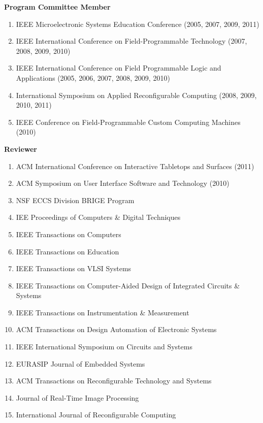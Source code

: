 \documentclass[line]{res}
\begin{document}
\begin{resume}
	\textbf{Program Committee Member}
	\begin{enumerate}
		\item IEEE Microelectronic Systems Education Conference (2005, 2007, 2009, 2011) 
		\item IEEE International Conference on Field-Programmable Technology (2007, 2008, 2009, 2010) 
		\item IEEE International Conference on Field Programmable Logic and Applications (2005, 2006, 2007, 2008, 2009, 2010) 
		\item International Symposium on Applied Reconfigurable Computing (2008, 2009, 2010, 2011) 
		\item IEEE Conference on Field-Programmable Custom Computing Machines (2010) 
	\end{enumerate}
	
	\textbf{Reviewer}
	\begin{enumerate}
		\item ACM International Conference on Interactive Tabletops and Surfaces (2011)
		\item ACM Symposium on User Interface Software and Technology (2010) 
		\item NSF ECCS Division BRIGE Program 
		\item IEE Proceedings of Computers \& Digital Techniques 
		\item IEEE Transactions on Computers 
		\item IEEE Transactions on Education 
		\item IEEE Transactions on VLSI Systems 
		\item IEEE Transactions on Computer-Aided Design of Integrated Circuits \& Systems 
		\item IEEE Transactions on Instrumentation \& Measurement 
		\item ACM Transactions on Design Automation of Electronic Systems 
		\item IEEE International Symposium on Circuits and Systems 
		\item EURASIP Journal of Embedded Systems 
		\item ACM Transactions on Reconfigurable Technology and Systems 
		\item Journal of Real-Time Image Processing 
		\item International Journal of Reconfigurable Computing 
	\end{enumerate}
	

\end{resume}
\end{document}
